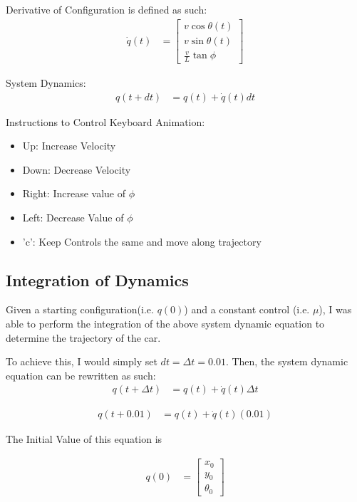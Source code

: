\documentclass{article}
\begin{document}
Derivative of Configuration is defined as such: \newline 
\begin{align}
    \dot{q}(t) &= \begin{bmatrix}
           v\cos{\theta(t)} \\
           v\sin{\theta(t)} \\
           \frac{v}{L} \tan{\phi}
         \end{bmatrix}
\end{align}

System Dynamics: \newline 
\begin{align}
    q(t + dt) &= q(t) + \dot{q}(t) dt
\end{align}

Instructions to Control Keyboard Animation: \newline 

\begin{itemize}
    \item Up: Increase Velocity
    \item Down: Decrease Velocity
    \item Right: Increase value of $\phi$
    \item Left: Decrease Value of $\phi$
    \item 'c': Keep Controls the same and move along trajectory
\end{itemize}

\subsection{Integration of Dynamics}
Given a starting configuration(i.e. $q(0)$) and a constant control (i.e. $\mu$), I was able to perform the integration of the above system dynamic equation to determine the trajectory of the car. 

To achieve this, I would simply set $dt = \Delta t = 0.01$. Then, the system dynamic equation can be rewritten as such: \newline 
\begin{align}
    q(t + \Delta t) &= q(t) + \dot{q}(t) \Delta t
\end{align}

\begin{align}
    q(t + 0.01) &= q(t) + \dot{q}(t) (0.01)
\end{align}

The Initial Value of this equation is 

\begin{align}
    q(0) &= \begin{bmatrix}
           x_0 \\
           y_0 \\
           \theta_0
         \end{bmatrix}
\end{align}
\end{document}
